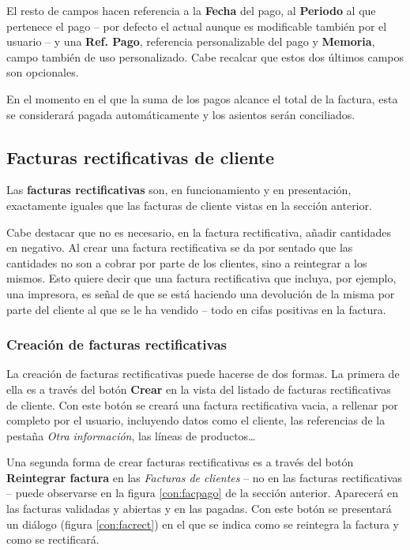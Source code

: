 El resto de campos hacen referencia a la \textbf{Fecha} del pago, al \textbf{Periodo} al que pertenece el pago -- por defecto el actual aunque es modificable también por el usuario -- y una \textbf{Ref. Pago}, referencia personalizable del pago  y \textbf{Memoria}, campo también de uso personalizado. Cabe recalcar que estos dos últimos campos son opcionales.

En el momento en el que la suma de los pagos alcance el total de la factura, esta se considerará pagada automáticamente y los asientos serán conciliados.




\subsection{Facturas rectificativas de cliente}

Las \textbf{facturas rectificativas} son, en funcionamiento y en presentación, exactamente iguales que las facturas de cliente vistas 
en la sección anterior.

Cabe destacar que no es necesario, en la factura rectificativa, añadir cantidades en negativo. Al crear una factura rectificativa se da por sentado que las cantidades no son a cobrar por parte de los clientes, sino a reintegrar a los mismos. Esto quiere decir que una factura rectificativa que incluya, por ejemplo, una impresora, es señal de que se está haciendo una devolución de la misma por parte del cliente al que se le ha vendido -- todo en cifas positivas en la factura.

\subsubsection{Creación de facturas rectificativas}

La creación de facturas rectificativas puede hacerse de dos formas. La primera de ella es a través del botón \textbf{Crear} en la vista del listado de facturas rectificativas de cliente. Con este botón se creará una factura rectificativa vacia, a rellenar por completo por el usuario, incluyendo datos como el cliente, las referencias de la pestaña \emph{Otra información}, las líneas de productos\ldots

Una segunda forma de crear facturas rectificativas es a través del botón \textbf{Reintegrar factura} en las \emph{Facturas de clientes} -- no en las facturas rectificativas -- puede observarse en la figura \ref{con:facpago} de la sección anterior. Aparecerá en las facturas validadas y abiertas y en las pagadas. Con este botón se presentará un diálogo (figura \ref{con:facrect}) en el que se indica como se reintegra la factura y como se rectificará.

